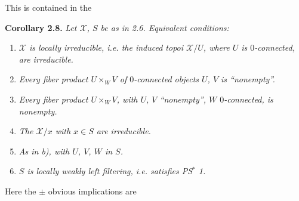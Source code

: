 \documentclass[11pt]{article}
\newcommand{\msp}[1]{\marginpar{\footnotesize [#1]}}
\newcommand{\sX}{\mathcal{X}} %
\begin{document}
\msp{page 21}

\noindent This is contained in the

\noindent\textbf{Corollary 2.8.} \textit{Let $\sX$, $S$ be as in 2.6. Equivalent conditions:}
\begin{enumerate}[label={},leftmargin=3em]
\item[\textit{a)}] \textit{$\sX$ is locally irreducible, i.e. the induced topoi $\sX/U$, where $U$ is $0$-connected, are irreducible.}
\item[\textit{b)}] \textit{Every fiber product $U \times_W V$ of $0$-connected objects $U$, $V$ is ``nonempty''.}
\item[\textit{b$'$)}] \textit{Every fiber product $U \times_W V$, with $U$, $V$ ``nonempty'', $W$ $0$-connected, is nonempty.}
\item[\textit{c)}] \textit{The $\sX/x$ with $x \in S$ are irreducible.}
\item[\textit{d)}] \textit{As in b), with $U$, $V$, $W$ in $S$.}
\item[\textit{e)}] \textit{$S$ is locally weakly left filtering, i.e. satisfies PS$^*$ 1.}
\end{enumerate}
\noindent Here the $\pm$ obvious implications are
\end{document}
